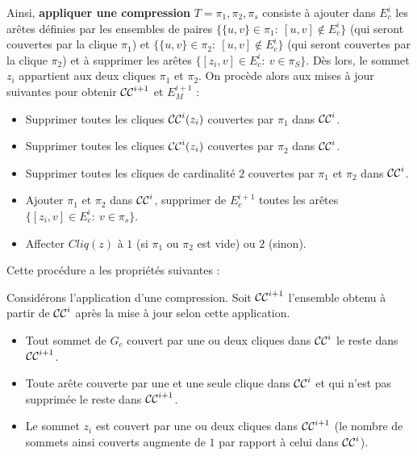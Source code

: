 Ainsi, {\bf appliquer une compression} $T = \pi_1, \pi_2, \pi_s$ consiste \`a ajouter dans $E_c^i$ les ar\^etes d\'efinies par les ensembles de paires $\{\{u,v\} \in \pi_1:~[u,v]\not\in E_{c}^{i}\}$ (qui seront couvertes par la clique $\pi_1$) et $\{\{u,v\} \in \pi_2:~[u,v]\not\in  E_{c}^{i}\}$ (qui seront couvertes par la clique $\pi_2$) et \`a supprimer les ar\^etes $\{[z_i,v] \in  E_{c}^{i}:~v\in \pi_S\}$. 
\newline
D\`es lors, le sommet $z_i$ appartient aux deux cliques $\pi_1$ et $\pi_2$.
On proc\`ede alors aux mises \`a jour suivantes pour obtenir ${\cal CC}^{i+1}$ et $E_M^{i+1}$ :
\begin{itemize}
\item Supprimer toutes les cliques ${\cal CC}^{i}(z_i)$ couvertes par $\pi_1$ dans  ${\cal CC}^{i}$.
\item Supprimer toutes les cliques ${\cal CC}^{i}(z_i)$ couvertes par $\pi_2$ dans  ${\cal CC}^{i}$.
\item Supprimer toutes les cliques de cardinalit\'e $2$ couvertes par $\pi_1$ et $\pi_2$ dans  ${\cal CC}^{i}$.
\item Ajouter $\pi_1$ et $\pi_2$ dans ${\cal CC}^{i}$, supprimer de $E_c^{i+1}$ toutes les ar\^etes  $\{[z_i,v] \in E_c^{i}:~v\in \pi_s\}$.
\item Affecter $Cliq(z)$ \`a $1$ (si $\pi_1$  ou $\pi_2$ est vide) ou $2$ (sinon).
\end{itemize}
Cette proc\'edure a les propri\'et\'es suivantes :
\begin{property}
Consid\'erons l'application d'une compression.\newline
Soit ${\cal CC}^{i+1}$  l'ensemble obtenu \`a partir de ${\cal CC}^{i}$ apr\`es  la mise \`a jour selon cette application.
\begin{itemize}
	\item Tout sommet de $G_c$ couvert par une ou deux cliques dans ${\cal CC}^{i}$ le reste dans ${\cal CC}^{i+1}$.
	\item Toute ar\^ete couverte par une et une seule clique dans ${\cal CC}^{i}$ et qui n'est pas supprim\'ee le reste dans ${\cal CC}^{i+1}$.
	\item Le sommet $z_i$ est couvert par une ou deux cliques dans ${\cal CC}^{i+1}$ (le nombre de sommets ainsi couverts augmente de $1$ par rapport \`a celui dans ${\cal CC}^{i}$).
\end{itemize}
\end{property}

